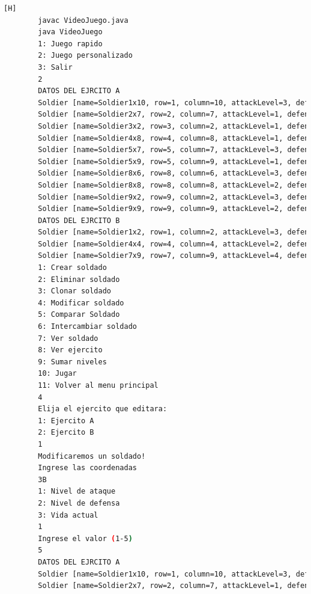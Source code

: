 \documentclass{article}
\begin{document}
	\begin{lstlisting}[language=bash,caption={Compilando y probando el metodo changeAttribute  }][H]
		javac VideoJuego.java
		java VideoJuego
		1: Juego rapido
		2: Juego personalizado
		3: Salir
		2
		DATOS DEL EJRCITO A
		Soldier [name=Soldier1x10, row=1, column=10, attackLevel=3, defenseLevel=1, actualLife=2, speed=0, attitude=Repose, current=true]
		Soldier [name=Soldier2x7, row=2, column=7, attackLevel=1, defenseLevel=5, actualLife=1, speed=0, attitude=Repose, current=true]
		Soldier [name=Soldier3x2, row=3, column=2, attackLevel=1, defenseLevel=2, actualLife=2, speed=0, attitude=Repose, current=true]
		Soldier [name=Soldier4x8, row=4, column=8, attackLevel=1, defenseLevel=2, actualLife=3, speed=0, attitude=Repose, current=true]
		Soldier [name=Soldier5x7, row=5, column=7, attackLevel=3, defenseLevel=2, actualLife=1, speed=0, attitude=Repose, current=true]
		Soldier [name=Soldier5x9, row=5, column=9, attackLevel=1, defenseLevel=4, actualLife=1, speed=0, attitude=Repose, current=true]
		Soldier [name=Soldier8x6, row=8, column=6, attackLevel=3, defenseLevel=5, actualLife=4, speed=0, attitude=Repose, current=true]
		Soldier [name=Soldier8x8, row=8, column=8, attackLevel=2, defenseLevel=5, actualLife=3, speed=0, attitude=Repose, current=true]
		Soldier [name=Soldier9x2, row=9, column=2, attackLevel=3, defenseLevel=1, actualLife=4, speed=0, attitude=Repose, current=true]
		Soldier [name=Soldier9x9, row=9, column=9, attackLevel=2, defenseLevel=5, actualLife=2, speed=0, attitude=Repose, current=true]
		DATOS DEL EJRCITO B
		Soldier [name=Soldier1x2, row=1, column=2, attackLevel=3, defenseLevel=4, actualLife=4, speed=0, attitude=Repose, current=true]
		Soldier [name=Soldier4x4, row=4, column=4, attackLevel=2, defenseLevel=1, actualLife=5, speed=0, attitude=Repose, current=true]
		Soldier [name=Soldier7x9, row=7, column=9, attackLevel=4, defenseLevel=2, actualLife=1, speed=0, attitude=Repose, current=true]
		1: Crear soldado
		2: Eliminar soldado
		3: Clonar soldado
		4: Modificar soldado
		5: Comparar Soldado
		6: Intercambiar soldado
		7: Ver soldado
		8: Ver ejercito
		9: Sumar niveles
		10: Jugar
		11: Volver al menu principal
		4
		Elija el ejercito que editara:
		1: Ejercito A
		2: Ejercito B
		1
		Modificaremos un soldado!
		Ingrese las coordenadas
		3B
		1: Nivel de ataque
		2: Nivel de defensa
		3: Vida actual
		1
		Ingrese el valor (1-5)
		5
		DATOS DEL EJRCITO A
		Soldier [name=Soldier1x10, row=1, column=10, attackLevel=3, defenseLevel=1, actualLife=2, speed=0, attitude=Repose, current=true]
		Soldier [name=Soldier2x7, row=2, column=7, attackLevel=1, defenseLevel=5, actualLife=1, speed=0, attitude=Repose, current=true]

\end{lstlisting}
\end{document}
